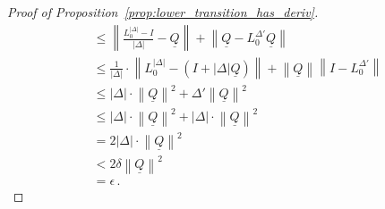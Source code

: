\documentclass[10pt]{paper}
\theoremstyle{definition}
\newcommand{\lrate}{\underline{Q}}
\newcommand{\norm}[1]{\left\lVert #1 \right\rVert}
\begin{document}
\begin{proof}[Proof of Proposition~\ref{prop:lower_transition_has_deriv}]
\begin{align*}
 &\leq \norm{\frac{L_{0}^{\lvert\Delta\rvert} - I}{\lvert\Delta\rvert} - \lrate} + \norm{\lrate - L_{0}^{\Delta'}\lrate} \\
 &\leq \frac{1}{\lvert\Delta\rvert}\cdot\norm{L_{0}^{\lvert\Delta\rvert} - (I+\lvert\Delta\rvert\lrate)} + \norm{\lrate}\norm{I - L_{0}^{\Delta'}} \\
 &\leq \lvert\Delta\rvert\cdot\norm{\lrate}^2 + \Delta'\norm{\lrate}^2 \\
 &\leq \lvert\Delta\rvert\cdot\norm{\lrate}^2 + \lvert\Delta\rvert\cdot\norm{\lrate}^2 \\
 &= 2\lvert\Delta\rvert\cdot\norm{\lrate}^2 \\
 &< 2\delta\norm{\lrate}^2 \\
 &= \epsilon\,.
\end{align*}
\end{proof}
\end{document}
